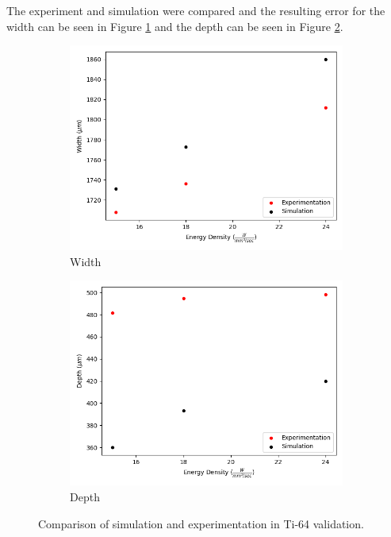 \documentclass[pdflatex,sn-mathphys]{sn-jnl}
\begin{document}
	The experiment and simulation were compared and the resulting error for the width can be seen in Figure \ref{fig:ti64_melt_track_width} and the depth can be seen in Figure \ref{fig:ti64_melt_track_depth}.
	\begin{figure}[!htb]\centering
		\begin{subfigure}[c]{0.45\textwidth}\centering
		\includegraphics[width=\textwidth]{ti64_melt_track_width}
		\caption{Width}
		\label{fig:ti64_melt_track_width}
		\end{subfigure}\hfill{}
			\begin{subfigure}[c]{0.45\textwidth}\centering
			\includegraphics[width=\textwidth]{ti64_melt_track_depth}
			\caption{Depth}
			\label{fig:ti64_melt_track_depth}
			\end{subfigure}
		\caption{Comparison of simulation and experimentation in Ti-64 validation.}
		\label{fig:ti64_melt_track}
	\end{figure}
\end{document}
